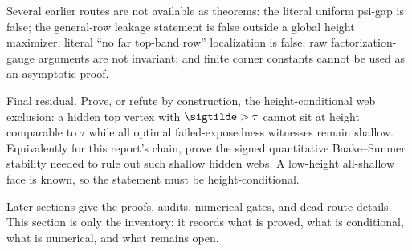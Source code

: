 \begin{refutedstatement}
Several earlier routes are not available as theorems: the literal uniform
psi-gap is false; the general-row leakage statement is false outside a
global height maximizer; literal ``no far top-band row'' localization is
false; raw factorization-gauge arguments are not invariant; and finite
corner constants cannot be used as an asymptotic proof.
\end{refutedstatement}

\begin{openproblem}
\openbadge
Final residual.  Prove, or refute by construction, the height-conditional
web exclusion: a hidden top vertex with \(\sigtilde>\tau\) cannot sit at
height comparable to \(\tau\) while all optimal failed-exposedness witnesses
remain shallow.  Equivalently for this report's chain, prove the signed
quantitative Baake--Sumner stability needed to rule out such shallow hidden
webs.  A low-height all-shallow face is known, so the statement must be
height-conditional.
\end{openproblem}

Later sections give the proofs, audits, numerical gates, and dead-route
details.  This section is only the inventory: it records what is proved, what
is conditional, what is numerical, and what remains open.

